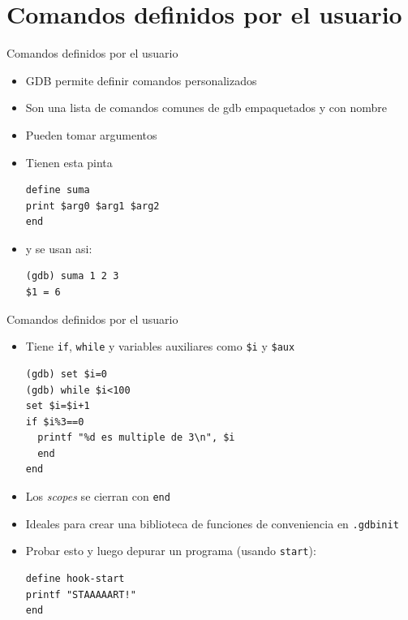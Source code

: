 \documentclass[xetex]{beamer}
\begin{document}
\section{Comandos definidos por el usuario}
\begin{frame}[fragile]{Comandos definidos por el usuario}
\begin{itemize}
\item GDB permite definir comandos personalizados
\item Son una lista de comandos comunes de gdb empaquetados y con nombre
\item Pueden tomar argumentos
\item Tienen esta pinta
\begin{verbatim}
define suma
print $arg0 $arg1 $arg2
end
\end{verbatim}
\item y se usan asi:
\begin{verbatim}
(gdb) suma 1 2 3
$1 = 6
\end{verbatim}
\end{itemize}
\end{frame}

\begin{frame}[fragile]{Comandos definidos por el usuario}
\begin{itemize}
\item Tiene \verb=if=, \verb=while= y variables auxiliares como \verb=$i= y \verb=$aux=
\begin{verbatim}
(gdb) set $i=0
(gdb) while $i<100
set $i=$i+1
if $i%3==0
  printf "%d es multiple de 3\n", $i
  end
end
\end{verbatim}
\item Los {\it scopes} se cierran con \verb=end=
\item Ideales para crear una biblioteca de funciones de conveniencia en \verb=.gdbinit= 
\item Probar esto y luego depurar un programa (usando \verb=start=):
\begin{verbatim}
define hook-start
printf "STAAAAART!"
end
\end{verbatim}
\end{itemize}
\end{frame}
\end{document}
